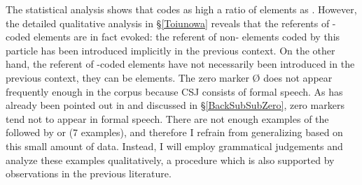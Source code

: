 The statistical analysis shows that
 codes as high a ratio of  elements as .
However, the detailed qualitative analysis in \S \ref{Toiunowa} reveals that
the referents of -coded elements are in fact evoked:
the referent of non- elements coded by this particle has been introduced implicitly in the previous context.
On the other hand,
the referent of -coded elements have not necessarily been introduced in the previous context,
they can be  elements.
The zero marker {\O} does not appear frequently enough in the corpus because CSJ consists of formal speech.
As has already been pointed out in  and discussed in \S \ref{BackSubSubZero},
zero markers tend not to appear in formal speech.
There are not enough examples of the  followed by  or  (7 examples),
and therefore I refrain from generalizing based on this small amount of data.
Instead,
I will employ grammatical judgements and analyze these examples qualitatively,
a procedure which is also supported by observations in the previous literature. 

